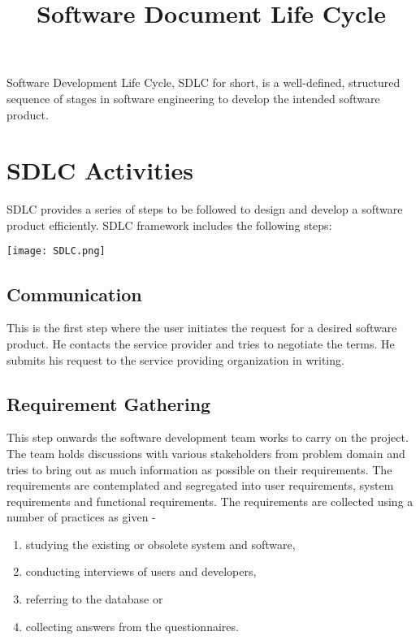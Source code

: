 \documentclass[11pt]{article}
\begin{document}
\title{ Software Document Life Cycle}
\author{}
\date{}
\maketitle


\tableofcontents

\leavevmode\thispagestyle{empty}\newpage

Software Development Life Cycle, SDLC for short, is a well-defined, structured sequence of stages in software engineering to develop the intended software product.
\section{SDLC Activities}
SDLC provides a series of steps to be followed to design and develop a software product efficiently. SDLC framework includes the following steps:

\begin{center}
\texttt{[image: SDLC.png]}
\end{center}

\subsection{Communication}
This is the first step where the user initiates the request for a desired software product. He contacts the service provider and tries to negotiate the terms. He submits his request to the service providing organization in writing.
\subsection{Requirement Gathering}
This step onwards the software development team works to carry on the project. The team holds discussions with various stakeholders from problem domain and tries to bring out as much information as possible on their requirements. The requirements are contemplated and segregated into user requirements, system requirements and functional requirements. The requirements are collected using a number of practices as given -

\begin{enumerate}
\item	studying the existing or obsolete system and software,
\item	conducting interviews of users and developers,
\item	referring to the database or
\item	collecting answers from the questionnaires.
\end{enumerate}
\end{document}
